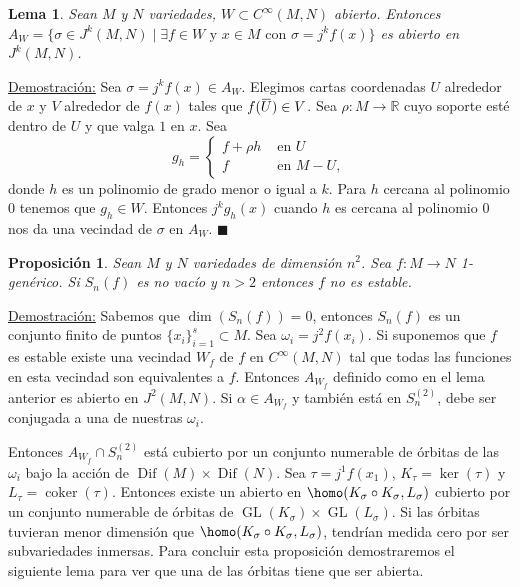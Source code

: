 \documentclass{report}
\newtheorem{prop}[theorem]{Proposici\'on}
\newtheorem{lem}[theorem]{Lema}
\theoremstyle{definition}
\DeclareMathOperator{\gl}{GL}
\DeclareMathOperator{\dif}{Dif}
\DeclareMathOperator{\cok}{coker}
\newcommand{\overbar}[1]{\mkern 1.5mu\overline{\mkern-1.5mu#1\mkern-1.5mu}\mkern 1.5mu}
\let\hom\homo
\DeclareMathOperator{\hom}{Hom}
\begin{document}
\begin{lem}
Sean $M$ y $N$ variedades, $W \subset C^\infty (M,N)$ abierto. Entonces $A_W = \{ \sigma \in J^k (M,N) \mid \exists f \in W \text{ y } x \in M \text{ con } \sigma = j^k f(x) \}$ es abierto en $J^k (M,N)$.
\end{lem}
\underline{Demostraci\'on:} Sea $\sigma = j^k f(x) \in A_W$. Elegimos cartas coordenadas $U$ alrededor de $x$ y $V$ alrededor de $f(x)$ tales que $f(\overbar{U} ) \in V$. Sea $\rho: M \to \mathbb{R}$ cuyo soporte est\'e dentro de $U$ y que valga $1$ en $x$. Sea 
$$g_h = \begin{cases}
f + \rho h & \text{ en } U\\
f & \text{ en } M - U,
\end{cases}$$
donde $h$ es un polinomio de grado menor o igual a $k$. Para $h$ cercana al polinomio $0$ tenemos que $g_h \in W$. Entonces $j^k g_h (x)$ cuando $h$ es cercana al polinomio $0$ nos da una vecindad de $\sigma$ en $A_W$. $\blacksquare$

\begin{prop}
Sean $M$ y $N$ variedades de dimensi\'on $n^2$. Sea $f: M \to N$ 1-gen\'erico. Si $S_n (f)$ es no vac\'io y $n > 2$ entonces $f$ no es estable.
\end{prop}
\underline{Demostraci\'on:} Sabemos que $\dim (S_n(f)) = 0$, entonces $S_n (f)$ es un conjunto finito de puntos $\{ x_i \}_{i=1}^s \subset M$. Sea $\omega_i = j^2 f(x_i)$. Si suponemos que $f$ es estable existe una vecindad $W_f$ de $f$ en $C^\infty (M,N)$ tal que todas las funciones en esta vecindad son equivalentes a $f$. Entonces $A_{W_f}$ definido como en el lema anterior es abierto en $J^2 (M,N)$. Si $\alpha \in A_{W_f}$ y tambi\'en est\'a en $S_n^{(2)}$, debe ser conjugada a una de nuestras $\omega_i$.

Entonces $A_{W_f} \cap S_n^{(2)}$ est\'a cubierto por un conjunto numerable de \'orbitas de las $\omega_i$ bajo la acci\'on de $\dif (M) \times \dif (N)$. Sea $\tau = j^1 f(x_1)$, $K_\tau = \ker (\tau)$ y $L_\tau = \cok (\tau)$. Entonces existe un abierto en $\hom (K_\sigma \circ K_\sigma , L_\sigma)$ cubierto por un conjunto numerable de \'orbitas de $\gl (K_\sigma) \times \gl (L_\sigma)$. Si las \'orbitas tuvieran menor dimensi\'on que $\hom (K_\sigma \circ K_\sigma , L_\sigma)$, tendr\'ian medida cero por ser subvariedades inmersas. Para concluir esta proposici\'on demostraremos el siguiente lema para ver que una de las \'orbitas tiene que ser abierta.
\end{document}
